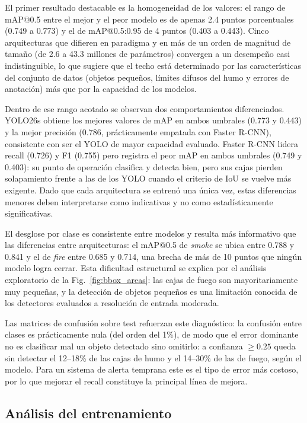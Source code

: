 \documentclass[conference]{IEEEtran}
\begin{document}
El primer resultado destacable es la homogeneidad de los valores: el rango de
mAP@0.5 entre el mejor y el peor modelo es de apenas 2.4 puntos porcentuales
(0.749 a 0.773) y el de mAP@0.5:0.95 de 4 puntos (0.403 a 0.443). Cinco
arquitecturas que difieren en paradigma y en más de un orden de magnitud de
tamaño (de 2.6 a 43.3 millones de parámetros) convergen a un desempeño casi
indistinguible, lo que sugiere que el techo está determinado por las
características del conjunto de datos (objetos pequeños, límites difusos del
humo y errores de anotación) más que por la capacidad de los modelos.

Dentro de ese rango acotado se observan dos comportamientos diferenciados.
YOLO26s obtiene los mejores valores de mAP en ambos umbrales (0.773 y 0.443)
y la mejor precisión (0.786, prácticamente empatada con Faster R-CNN),
consistente con ser el YOLO de mayor capacidad evaluado. Faster R-CNN lidera
recall (0.726) y F1 (0.755) pero registra el peor mAP en ambos umbrales
(0.749 y 0.403): su punto de operación clasifica y detecta bien, pero sus
cajas pierden solapamiento frente a las de los YOLO cuando el criterio de
IoU se vuelve más exigente. Dado que cada arquitectura se entrenó
una única vez, estas diferencias menores deben interpretarse como indicativas
y no como estadísticamente significativas.

El desglose por clase es consistente entre modelos y resulta más informativo
que las diferencias entre arquitecturas: el mAP@0.5 de \textit{smoke} se
ubica entre 0.788 y 0.841 y el de \textit{fire} entre 0.685 y 0.714, una
brecha de más de 10 puntos que ningún modelo logra cerrar. Esta dificultad
estructural se explica por el análisis exploratorio de la
Fig.~\ref{fig:bbox_areas}: las cajas de fuego son mayoritariamente muy
pequeñas, y la detección de objetos pequeños es una limitación conocida de
los detectores evaluados a resolución de entrada moderada.

Las matrices de confusión sobre test refuerzan este diagnóstico: la
confusión entre clases es prácticamente nula (del orden del 1\%), de modo
que el error dominante no es clasificar mal un objeto detectado sino
omitirlo: a confianza $\geq 0.25$ queda sin detectar el 12--18\% de las
cajas de humo y el 14--30\% de las de fuego, según el modelo. Para un
sistema de alerta temprana este es el tipo de error más costoso, por lo que
mejorar el recall constituye la principal línea de mejora.

\subsection{Análisis del entrenamiento}\label{sec:entrenamiento}
\end{document}
